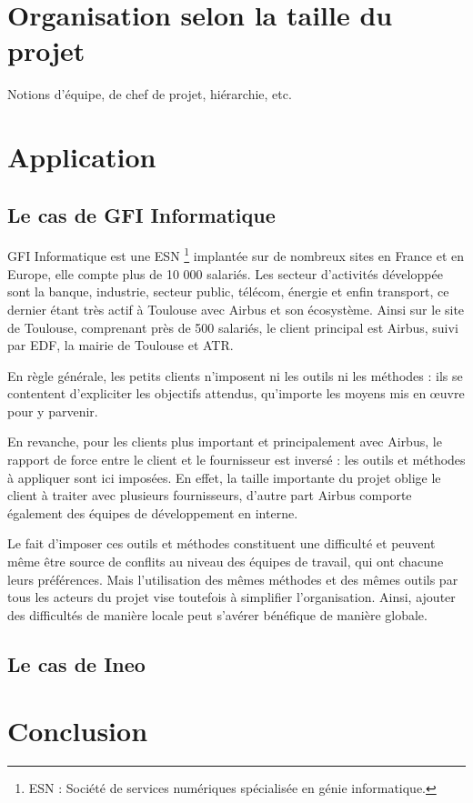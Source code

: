 \section{Organisation selon la taille du projet}

Notions d'équipe, de chef de projet, hiérarchie, etc.

\section{Application}

\subsection{Le cas de GFI Informatique}

GFI Informatique est une \gls{ESN} \footnote{ESN : Société de services numériques spécialisée en génie informatique.} implantée sur de nombreux sites en France et en Europe, elle compte plus de 10 000 salariés. Les secteur d'activités développée sont la banque, industrie, secteur public, télécom, énergie et enfin transport, ce dernier étant très actif à Toulouse avec Airbus et son écosystème. Ainsi sur le site de Toulouse, comprenant près de 500 salariés, le client principal est Airbus, suivi par EDF, la mairie de Toulouse et ATR.

En règle générale, les petits clients n'imposent ni les outils ni les méthodes : ils se contentent d'expliciter les objectifs attendus, qu'importe les moyens mis en œuvre pour y parvenir.

En revanche, pour les clients plus important et principalement avec Airbus, le rapport de force entre le client et le fournisseur est inversé : les outils et méthodes à appliquer sont ici imposées. En effet, la taille importante du projet oblige le client à traiter avec plusieurs fournisseurs, d'autre part Airbus comporte également des équipes de développement en interne.

Le fait d'imposer ces outils et méthodes constituent une difficulté et peuvent même être source de conflits au niveau des équipes de travail, qui ont chacune leurs préférences. Mais l'utilisation des mêmes méthodes et des mêmes outils par tous les acteurs du projet vise toutefois à simplifier l'organisation. Ainsi, ajouter des difficultés de manière locale peut s'avérer bénéfique de manière globale.

\subsection{Le cas de Ineo}



\section{Conclusion}
